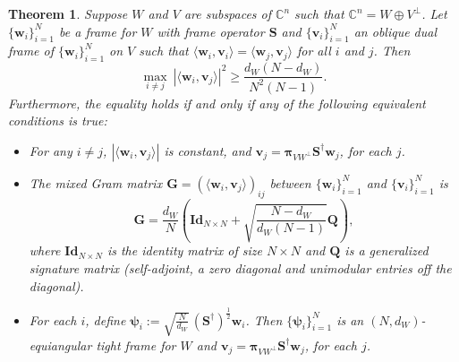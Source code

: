 \documentclass{amsart}
\numberwithin{equation}{section}
\newcommand{\bpi}{{\boldsymbol{\pi}}}
\theoremstyle{plain}
\newtheorem{theorem}{Theorem}[section]
\theoremstyle{remark}
\theoremstyle{definition}
\begin{document}
\begin{theorem}\label{thm:mixedCoherence}
     Suppose $W$ and $V$ are subspaces of $\mathbb{C}^n$ such that $\mathbb{C}^n = W \oplus V^\perp$. Let $\{\mathbf{w}_i\}_{i=1}^N$ be a frame for $W$ with frame operator $\mathbf{S}$ and $\{\mathbf{v}_i\}_{i=1}^N$ an oblique dual frame of $\{\mathbf{w}_i\}_{i=1}^N$ on $V$ such that $\langle \mathbf{w}_i, \mathbf{v}_i \rangle = \langle \mathbf{w}_j, \mathbf{v}_j \rangle$ for all $i$ and $j$. Then
    \begin{equation*}
       \underset{i \neq j}{\max} \ |\langle \mathbf{w}_i, \mathbf{v}_j \rangle |^2 \geq \frac{d_W(N-d_W)}{N^2(N-1)}.
    \end{equation*}
Furthermore, the equality holds if and only if any of the following equivalent conditions is true:
\begin{itemize}
    \item[$(1)$] For any $i \neq j$, $|\langle \mathbf{w}_i, \mathbf{v}_j \rangle |$ is constant, and $\mathbf{v}_j = \bpi_{VW^\perp} \mathbf{S}^\dagger \mathbf{w}_j$, for each $j$. 
    \item[$(2)$] The mixed Gram matrix $\mathbf{G} = (\langle \mathbf{w}_i, \mathbf{v}_j \rangle)_{ij}$ between $\{\mathbf{w}_i\}_{i=1}^N$ and $\{\mathbf{v}_i\}_{i=1}^N$ is
    \begin{equation*}
        \mathbf{G} =\frac{d_W}{N} \left(\mathbf{Id}_{N \times N} + \sqrt{\frac{N-d_W}{d_W(N-1)}}\mathbf{Q}\right),
    \end{equation*}
    where $\mathbf{Id}_{N \times N}$ is the identity matrix of size $N \times N$ and $\mathbf{Q}$ is a generalized signature matrix (self-adjoint, a zero diagonal and unimodular entries off the diagonal). 
    \item[$(3)$] For each $i$, define $
\boldsymbol{\psi}_i :=  \sqrt{\tfrac{N}{d_W}} \, (\mathbf{S}^\dagger)^{\frac{1}{2}} \mathbf{w}_i$.
Then $\{\boldsymbol{\psi}_i\}_{i=1}^N$ is an $(N,d_W)$- equiangular tight frame for $W$ and $\mathbf{v}_j = \bpi_{VW^\perp} \mathbf{S}^\dagger \mathbf{w}_j$, for each $j$.
    
\end{itemize}
\end{theorem}
\end{document}
